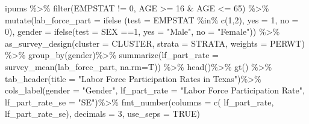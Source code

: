\documentclass[
  letterpaper,
  DIV=11,
  numbers=noendperiod]{scrreprt}
\newenvironment{Shaded}{\begin{snugshade}}{\end{snugshade}}
\newcommand{\AttributeTok}[1]{\textcolor[rgb]{0.40,0.45,0.13}{#1}}
\newcommand{\ConstantTok}[1]{\textcolor[rgb]{0.56,0.35,0.01}{#1}}
\newcommand{\DecValTok}[1]{\textcolor[rgb]{0.68,0.00,0.00}{#1}}
\newcommand{\FunctionTok}[1]{\textcolor[rgb]{0.28,0.35,0.67}{#1}}
\newcommand{\NormalTok}[1]{\textcolor[rgb]{0.00,0.23,0.31}{#1}}
\newcommand{\SpecialCharTok}[1]{\textcolor[rgb]{0.37,0.37,0.37}{#1}}
\newcommand{\StringTok}[1]{\textcolor[rgb]{0.13,0.47,0.30}{#1}}
\begin{document}
\begin{Shaded}
\begin{Highlighting}[]
\NormalTok{ipums }\SpecialCharTok{\%\textgreater{}\%}
  \FunctionTok{filter}\NormalTok{(EMPSTAT }\SpecialCharTok{!=} \DecValTok{0}\NormalTok{,}
\NormalTok{         AGE }\SpecialCharTok{\textgreater{}=} \DecValTok{16} \SpecialCharTok{\&}\NormalTok{ AGE }\SpecialCharTok{\textless{}=} \DecValTok{65}\NormalTok{) }\SpecialCharTok{\%\textgreater{}\%}
  \FunctionTok{mutate}\NormalTok{(}\AttributeTok{lab\_force\_part =} \FunctionTok{ifelse}\NormalTok{ (}\AttributeTok{test =}\NormalTok{ EMPSTAT }\SpecialCharTok{\%in\%} \FunctionTok{c}\NormalTok{(}\DecValTok{1}\NormalTok{,}\DecValTok{2}\NormalTok{),}
                                  \AttributeTok{yes =} \DecValTok{1}\NormalTok{,}
                                  \AttributeTok{no =} \DecValTok{0}\NormalTok{), }
         \AttributeTok{gender =} \FunctionTok{ifelse}\NormalTok{(}\AttributeTok{test =}\NormalTok{ SEX }\SpecialCharTok{==}\DecValTok{1}\NormalTok{,}
                         \AttributeTok{yes =} \StringTok{"Male"}\NormalTok{,}
                         \AttributeTok{no =} \StringTok{"Female"}\NormalTok{)) }\SpecialCharTok{\%\textgreater{}\%}
  \FunctionTok{as\_survey\_design}\NormalTok{(}\AttributeTok{cluster =}\NormalTok{ CLUSTER,}
                   \AttributeTok{strata =}\NormalTok{ STRATA,}
                   \AttributeTok{weights =}\NormalTok{ PERWT) }\SpecialCharTok{\%\textgreater{}\%}
  \FunctionTok{group\_by}\NormalTok{(gender)}\SpecialCharTok{\%\textgreater{}\%}
  \FunctionTok{summarize}\NormalTok{(}\AttributeTok{lf\_part\_rate =} \FunctionTok{survey\_mean}\NormalTok{(lab\_force\_part, }\AttributeTok{na.rm=}\NormalTok{T)) }\SpecialCharTok{\%\textgreater{}\%}  
  \FunctionTok{head}\NormalTok{()}\SpecialCharTok{\%\textgreater{}\%}
  \FunctionTok{gt}\NormalTok{() }\SpecialCharTok{\%\textgreater{}\%}
    \FunctionTok{tab\_header}\NormalTok{(}\AttributeTok{title =} \StringTok{"Labor Force Participation Rates in Texas"}\NormalTok{)}\SpecialCharTok{\%\textgreater{}\%}
    \FunctionTok{cols\_label}\NormalTok{(}\AttributeTok{gender =} \StringTok{"Gender"}\NormalTok{,}
                 \AttributeTok{lf\_part\_rate =} \StringTok{"Labor Force Participation Rate"}\NormalTok{,}
                \AttributeTok{lf\_part\_rate\_se =} \StringTok{"SE"}\NormalTok{)}\SpecialCharTok{\%\textgreater{}\%}
    \FunctionTok{fmt\_number}\NormalTok{(}\AttributeTok{columns =} \FunctionTok{c}\NormalTok{( lf\_part\_rate,  lf\_part\_rate\_se), }
                 \AttributeTok{decimals =} \DecValTok{3}\NormalTok{, }\AttributeTok{use\_seps =} \ConstantTok{TRUE}\NormalTok{)}
\end{Highlighting}
\end{Shaded}
\end{document}
